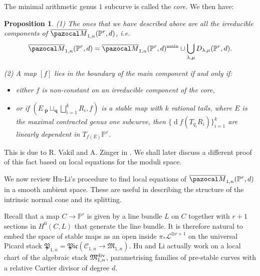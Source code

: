 \documentclass[11pt]{amsart}
\newcommand{\M}[4]{\overline{\pazocal M}_{#1,#2}(#3,#4)}
\newcommand{\PP}{\mathbb P}
\renewcommand{\to}{\rightarrow}
\newcommand{\cC}{\mathcal C}
\newcommand{\MM}{\mathfrak M}
\theoremstyle{plain}
\newtheorem{prop}[thm]{Proposition}
\theoremstyle{definition}
\begin{document}
The minimal arithmetic genus $1$ subcurve is called the \emph{core}. We then have:
\begin{prop}\label{prop:components}
\emph{(1)} The ones that we have described above are all the irreducible components of $\M{1}{n}{\PP^r}{d}$, %
i.e.
$$\M{1}{n}{\PP^r}{d}=\M{1}{n}{\PP^r}{d}^{\rm{main}}\cup\bigcup_{\lambda,\mu}D_{\lambda,\mu}(\PP^r,d).$$

\emph{(2)} A map $[f]$ lies in the boundary of the main component  if and only if:
\begin{itemize}
\item either $f$ is non-constant on an irreducible component of the core,
\item or if $(E\ {}_{\mathbf p}\!\sqcup_{\mathbf q}\bigsqcup_{i=1}^k R_i,f)$ is a stable map with $k$ rational tails, where $E$ is the maximal contracted genus one subcurve, then $\{\operatorname{d}\!f(T_{q_i}R_i)\}_{i=1}^k$ are \emph{linearly dependent} in $T_{f(E)}\PP^r$.
\end{itemize}
\end{prop}
 
This is due to R. Vakil and A. Zinger in \cite{Vre,VZpreview}. We shall later discuss a different proof of this fact based on local equations for the moduli space.

We now review Hu-Li's procedure \cite{HL} to find local equations of $\M{1}{n}{\PP^r}{d}$ in a smooth ambient space. These are useful in describing the structure of the intrinsic normal cone and its splitting.

Recall that a map $C\to\PP^r$ is given by a line bundle $L$ on $C$ together with $r+1$ sections in $H^0(C,L)$ that generate the line bundle. It is therefore natural to embed the space of stable maps as an open inside $\pi_*\mathcal L^{\oplus r+1}$ on the universal Picard stack $\mathfrak{P}_{1,n}=\mathfrak{Pic}(\cC_{1,n}\to\MM_{1,n})$.
Hu and Li actually work on a local chart of the algebraic stack $\mathfrak M_{1,n}^{\rm{div}}$, parametrising families of pre-stable curves with a relative Cartier divisor of degree $d$. 
\end{document}
